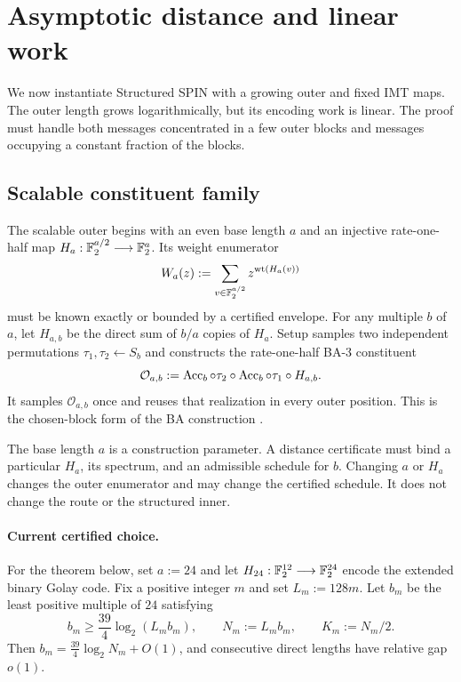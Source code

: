 \section{Asymptotic distance and linear work}
\label{sec:structured-distance}

We now instantiate Structured SPIN with a growing outer and fixed IMT maps.
The outer length grows logarithmically, but its encoding work is linear.
The proof must handle both messages concentrated in a few outer blocks
and messages occupying a constant fraction of the blocks.

\subsection{Scalable constituent family}
\label{sec:structured-scalable}

The scalable outer begins with an even base length $a$ and an injective
rate-one-half map $H_a:\mathbb F_2^{a/2}\longrightarrow\mathbb F_2^a$.
Its weight enumerator
\[
  W_a(z):=\sum_{v\in\mathbb F_2^{a/2}}z^{\operatorname{wt}(H_a(v))}
\]
must be known exactly or bounded by a certified envelope. For any multiple
$b$ of $a$, let $H_{a,b}$ be the direct sum of $b/a$ copies of $H_a$.
Setup samples two independent permutations $\tau_1,\tau_2\gets S_b$ and
constructs the rate-one-half BA-3 constituent
\begin{equation}
  \mathcal O_{a,b}
  :=
  \operatorname{Acc}_b\circ\tau_2\circ
  \operatorname{Acc}_b\circ\tau_1\circ H_{a,b}.
  \label{eq:ba3-outer}
\end{equation}
It samples $\mathcal O_{a,b}$ once and reuses that realization in every outer
position. This is the chosen-block form of the BA construction
\cite{KolesnikovEtAl2026BA,cryptoeprint:2026/1903}.

The base length $a$ is a construction parameter. A distance certificate must
bind a particular $H_a$, its spectrum, and an admissible schedule for $b$.
Changing $a$ or $H_a$ changes the outer enumerator and may change the certified
schedule. It does not change the route or the structured inner.

\paragraph{Current certified choice.}
For the theorem below, set $a:=24$ and let
$H_{24}:\mathbb F_2^{12}\longrightarrow\mathbb F_2^{24}$ encode the extended binary Golay code. Fix a positive integer $m$ and set
$L_m:=128m$. Let $b_m$ be the least positive multiple of $24$ satisfying
\begin{equation}
  b_m\ge \frac{39}{4}\log_2(L_mb_m),
  \qquad
  N_m:=L_mb_m,
  \qquad
  K_m:=N_m/2.
  \label{eq:structured-native-schedule}
\end{equation}
Then $b_m=\frac{39}{4}\log_2N_m+O(1)$, and consecutive direct lengths have relative
gap $o(1)$.


